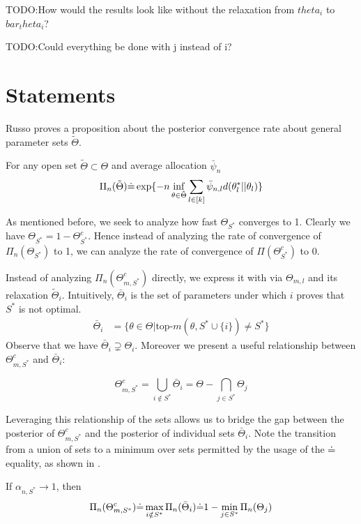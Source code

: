 TODO:How would the results look like without the relaxation from $theta_i$ to $bar_theta_i$?

TODO:Could everything be done with j instead of i?

\section{Statements}\label{section:optimal_statements}
Russo proves a proposition about the posterior convergence rate about general parameter sets $\tilde{\Theta}$.

\begin{proposition}\label{proposition:prop5}
  For any open set $\tilde{\Theta} \subset \Theta$ and average allocation $\bar{\psi}_n$
  \[\Pi_n(\tilde{\Theta}) \dot{=} \exp\{-n \inf_{\theta \in \tilde{\Theta}} \sum_{l \in [k]} \bar{\psi}_{n, l} d(\theta^*_l || \theta_l)\}\]
\end{proposition}

As mentioned before, we seek to analyze how fast $\Theta_{S^*}$ converges to 1. Clearly we have $\Theta_{S^*} = 1 - \Theta_{S^*}^c$. Hence instead of analyzing the rate of convergence of $\Pi_n(\Theta_{S^*})$ to 1, we can analyze the rate of convergence of $\Pi(\Theta_{S^*}^c)$ to 0.

Instead of analyzing $\Pi_n(\Theta_{m, S^*}^c)$ directly, we express it with via $\Theta_{m, l}$ and its relaxation $\tilde{\Theta}_i$. Intuitively, $\bar{\Theta}_i$ is the set of parameters under which $i$ proves that $S^*$ is not optimal.
\begin{align}
    \bar{\Theta}_i &= \{ \theta \in \Theta | \text{top-}m(\theta, S^* \cup \{i\}) \neq S^*\}
\end{align}
Observe that we have $\bar{\Theta}_i \supsetneq \Theta_i$. Moreover we present a useful relationship between $\Theta_{m, S^*}^c$ and $\bar{\Theta}_i$:
\begin{lemma}\label{lemma:set_relation_S*_i}
  \[\Theta_{m, S^*}^c = \bigcup_{i \notin S^*} \bar{\Theta}_i = \Theta - \bigcap_{j \in S^*} \Theta_j\]
\end{lemma}
Leveraging this relationship of the sets allows us to bridge the gap between the posterior of $\Theta_{m, S^*}^c$ and the posterior of individual sets $\bar{\Theta}_i$. Note the transition from a union of sets to a minimum over sets permitted by the usage of the $\dot{=}$ equality, as shown in .
\begin{lemma}\label{lemma:posterior_S*_i} If $\alpha_{n, S^*} \rightarrow 1$, then
  \begin{align}
    \Pi_n(\Theta_{m, S^*}^c) \dot{=} \max_{i \notin S^*} \Pi_n(\bar{\Theta}_i) \dot{=} 1 - \min_{j \in S^*} \Pi_n(\Theta_j)
  \end{align}
\end{lemma}

